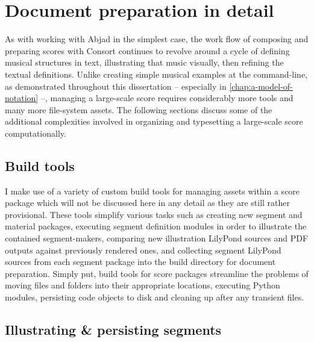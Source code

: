 \section{Document preparation in detail}
\label{sec:document-preparation-in-detail}

As with working with Abjad in the simplest case, the work flow of composing and
preparing scores with Consort continues to revolve around a cycle of defining
musical structures in text, illustrating that music visually, then refining the
textual definitions. Unlike creating simple musical examples at the
command-line, as demonstrated throughout this dissertation -- especially in
\autoref{chap:a-model-of-notation} --, managing a large-scale score requires
considerably more tools and many more file-system assets. The following
sections discuss some of the additional complexities involved in organizing and
typesetting a large-scale score computationally.

\subsection{Build tools}
\label{ssec:build-tools}


I make use of a variety of custom build tools for managing assets within a
score package which will not be discussed here in any detail as they are still
rather provisional. These tools simplify various tasks such as creating new
segment and material packages, executing segment definition modules in order to
illustrate the contained segment-makers, comparing new illustration LilyPond
sources and PDF outputs against previously rendered ones, and collecting
segment LilyPond sources from each segment package into the build directory for
document preparation. Simply put, build tools for score packages streamline the
problems of moving files and folders into their appropriate locations,
executing Python modules, persisting code objects to disk and cleaning up after
any transient files.

\subsection{Illustrating \& persisting segments}
\label{ssec:illustrating-and-persisting-segments}

